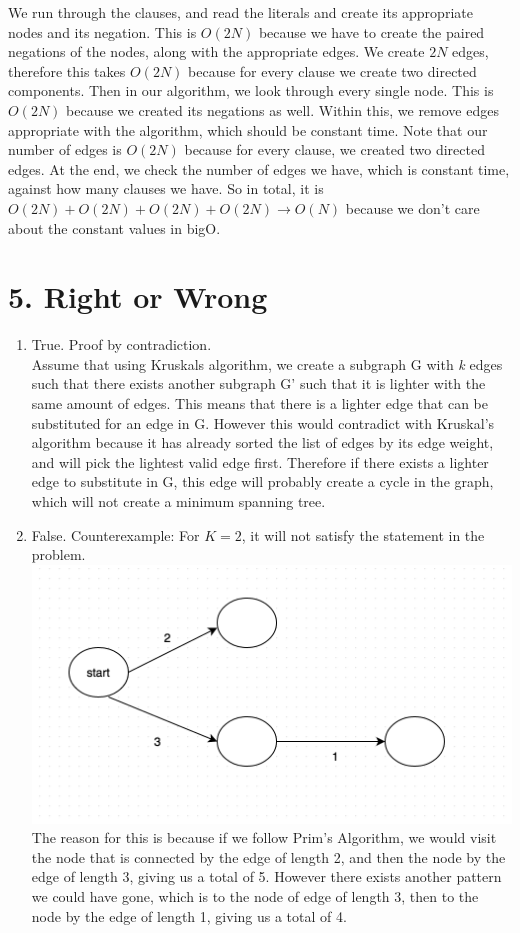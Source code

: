 \documentclass[11pt]{article}
\newenvironment{qparts}{\begin{enumerate}[{(}a{)}]}{\end{enumerate}}
\begin{document}
\begin{qparts}
We run through the clauses, and read the literals and create its appropriate nodes and its negation. This is $O(2N)$ because we have to create the paired negations of the nodes, along with the appropriate edges. We create $2N$ edges, therefore this takes $O(2N)$ because for every clause we create two directed components. Then in our algorithm, we look through every single node. This is $O(2N)$ because we created its negations as well. Within this, we remove edges appropriate with the algorithm, which should be constant time. Note that our number of edges is $O(2N)$ because for every clause, we created two directed edges. At the end, we check the number of edges we have, which is constant time, against how many clauses we have. So in total, it is $O(2N) + O(2N) + O(2N) + O(2N) \rightarrow O(N)$ because we don't care about the constant values in bigO.
\end{qparts}

\newpage
\section*{5. Right or Wrong}
\begin{qparts}
\item True. Proof by contradiction. \\
Assume that using Kruskals algorithm, we create a subgraph G with \textit{k} edges such that there exists another subgraph G' such that it is lighter with the same amount of edges. This means that there is a lighter edge that can be substituted for an edge in G. However this would contradict with Kruskal's algorithm because it has already sorted the list of edges by its edge weight, and will pick the lightest valid edge first. Therefore if there exists a lighter edge to substitute in G, this edge will probably create a cycle in the graph, which will not create a minimum spanning tree. 

\item False. Counterexample:  For $K = 2$, it will not satisfy the statement in the problem. \\
\includegraphics[scale=0.7]{counter} \\
The reason for this is because if we follow Prim's Algorithm, we would visit the node that is connected by the edge of length 2, and then the node by the edge of length 3, giving us a total of 5. However there exists another pattern we could have gone, which is to the node of edge of length 3, then to the node by the edge of length 1, giving us a total of 4. 


\end{qparts}
\end{document}
